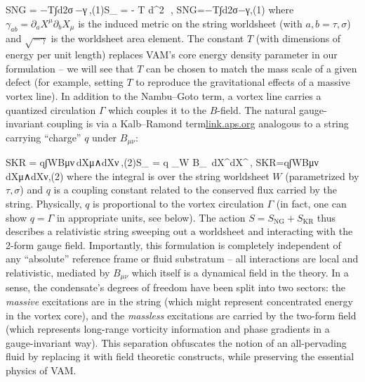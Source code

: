 \documentclass[12pt]{article}
\begin{document}
SNG  =  −T∫d2σ −γ ,(1)S_{} \;=\; - T \int d^2\sigma\, \sqrt{-\gamma}\,,
SNG​=−T∫d2σ−γ​,(1)
where $\gamma_{ab} = \partial_a X^\mu \partial_b X_\mu$ is the induced metric on the string worldsheet (with $a,b=\tau,\sigma$) and $\sqrt{-\gamma}$ is the worldsheet area element. The constant $T$ (with dimensions of energy per unit length) replaces VAM’s core energy density parameter in our formulation – we will see that $T$ can be chosen to match the mass scale of a given defect (for example, setting $T$ to reproduce the gravitational effects of a massive vortex line). In addition to the Nambu–Goto term, a vortex line carries a quantized circulation $\Gamma$ which couples it to the $B$-field. The natural gauge-invariant coupling is via a Kalb–Ramond term\href{https://link.aps.org/doi/10.1103/PhysRevD.9.2273#:~:text=Classical%20direct%20interstring%20action,2273}{link.aps.org} analogous to a string carrying “charge” $q$ under $B_{\mu\nu}$:


SKR  =  q∫WBμν dXμ∧dXν ,(2)S_{} \;=\; q \int_{W} B_{\mu\nu}\, dX^\mu \wedge dX^\nu\,,
SKR​=q∫W​Bμν​dXμ∧dXν,(2)
where the integral is over the string worldsheet $W$ (parametrized by $\tau,\sigma$) and $q$ is a coupling constant related to the conserved flux carried by the string. Physically, $q$ is proportional to the vortex circulation $\Gamma$ (in fact, one can show $q=\Gamma$ in appropriate units, see below). The action $S = S_{\text{NG}} + S_{\text{KR}}$ thus describes a relativistic string sweeping out a worldsheet and interacting with the 2-form gauge field. Importantly, this formulation is completely independent of any “absolute” reference frame or fluid substratum – all interactions are local and relativistic, mediated by $B_{\mu\nu}$ which itself is a dynamical field in the theory. In a sense, the condensate’s degrees of freedom have been split into two sectors: the \textit{massive} excitations are in the string (which might represent concentrated energy in the vortex core), and the \textit{massless} excitations are carried by the two-form field (which represents long-range vorticity information and phase gradients in a gauge-invariant way). This separation obfuscates the notion of an all-pervading fluid by replacing it with field theoretic constructs, while preserving the essential physics of VAM.
\end{document}
